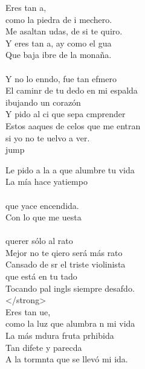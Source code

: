 \begin{cancion}%
	Eres tan a, \\
	como la piedra de i mechero.\\
	Me asaltan udas, de si te quiro.\\
	Y eres tan a, ay como el gua \\
	Que baja ibre de la monaña.\\
	\jump\\
	Y no lo enndo, fue tan efmero \\
	El caminr de tu dedo en mi espalda \\
	ibujando un corazón\\
	Y pido al ci que sepa cmprender\\
	Estos aaques de celos que me entran\\
	si yo no te uelvo a ver.\\jump\\
	\begin{chorus}%
	Le pido a la a que alumbre tu vida\\
	La mía hace yatiempo \\
	\jump\\
que yace encendida.\\
	Con lo que me uesta \\
	\jump\\
querer sólo al rato\\
	Mejor no te qiero será más rato\\
	Cansado de sr el triste violinista \\
	que está en tu tado\\
	Tocando pal ingls siempre desafdo. \\
 </strong>\\
	Eres tan ue, \\
	como la luz que alumbra n mi vida\\
	La más mdura fruta prhibida\\
	Tan difete y parecda\\
	A la tormnta que se llevó mi ida.\\

\end{chorus}
\end{cancion}
